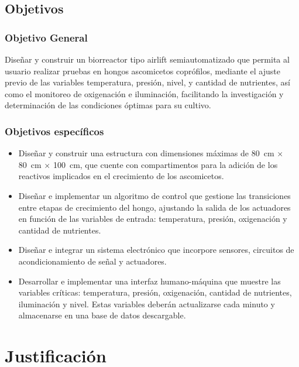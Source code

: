\documentclass[11pt,tesis,twoside,openright,spanish]{upiiztt}
\begin{document}
\section{Objetivos}

\subsection{Objetivo General}

Diseñar y construir un biorreactor tipo airlift semiautomatizado que permita al
usuario realizar pruebas en hongos ascomicetos coprófilos, mediante el ajuste
previo de las variables temperatura, presión, nivel, y cantidad de nutrientes, así
como el monitoreo de oxigenación e iluminación, facilitando la investigación y
determinación de las condiciones óptimas para su cultivo.

\subsection{Objetivos específicos}

\begin{itemize}
  \item Diseñar y construir una estructura con dimensiones máximas de 80~cm $\times$ 80~cm $\times$ 100~cm, que cuente con compartimentos para la adición de los reactivos implicados en el crecimiento de los ascomicetos.
  \item Diseñar e implementar un algoritmo de control que gestione las transiciones entre etapas de crecimiento del hongo, ajustando la salida de los actuadores en función de las variables de entrada: temperatura, presión, oxigenación y cantidad de nutrientes.
  \item Diseñar e integrar un sistema electrónico que incorpore sensores, circuitos de acondicionamiento de señal y actuadores.
  \item Desarrollar e implementar una interfaz humano-máquina que muestre las variables críticas: temperatura, presión, oxigenación, cantidad de nutrientes, iluminación y nivel. Estas variables deberán actualizarse cada minuto y almacenarse en una base de datos descargable.
\end{itemize}

\chapter{Justificación}\label{cap2}
\end{document}
